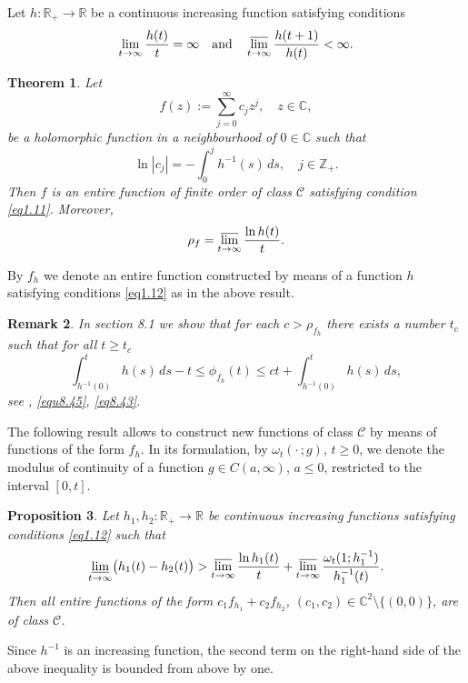 \documentclass[11pt, oneside]{amsart}
\newtheorem{Th}{Theorem}[section]
\newtheorem{Proposition}[Th]{Proposition}
\newtheorem{R}[Th]{Remark}
\begin{document}
Let $h: \mathbb R_+\rightarrow \mathbb R$ be a continuous increasing function satisfying conditions
\begin{equation}\label{eq1.12}
\lim_{t\rightarrow\infty}\frac{h(t)}{t}=\infty\quad {\rm and}\quad \varlimsup_{t\rightarrow\infty}\frac{h(t+1)}{h(t)}<\infty.
\end{equation}
\begin{Th}\label{theo1.11}
Let 
\[
f(z):=\sum_{j=0}^\infty c_j z^j,\quad z\in\mathbb C,
\]
be a holomorphic function in a neighbourhood of $0\in\mathbb C$ such that
\[
\ln |c_j|=-\int_0^{j} h^{-1}(s)\, ds,\quad j\in\mathbb Z_+.
\]
Then $f$ is an entire function of finite order of class $\mathscr C$ satisfying condition \eqref{eq1.11}. Moreover,
\[
\rho_f=\varlimsup_{t\rightarrow\infty}\frac{\ln h(t)}{t}.
\]
\end{Th}
By $f_h$ we denote an entire function constructed by means of a function $h$  satisfying conditions \eqref{eq1.12} as in the above result. 
\begin{R}\label{rem1.18}
{\rm In section 8.1 we show that for each $c>\rho_{f_h}$ there exists a number $t_c$ such that for all $t\ge t_c$
\[
\int_{h^{-1}(0)}^t h(s)\,ds-t\le \phi_{f_h}(t)\le ct+\int_{h^{-1}(0)}^t h(s)\,ds,
\]
see \cite[Ch.\,I.2]{L}, \eqref{equ8.45},  \eqref{eq8.43}.}
\end{R}
The following result allows to construct new functions of class $\mathscr C$ by means of functions of the form $f_h$.
In its formulation, by $\omega_t(\cdot\, ;g)$, $t\ge 0$, we denote the modulus of continuity of a function $g\in C(a,\infty)$, $a\le 0$, restricted to the interval $[0,t]$.
\begin{Proposition}\label{prop1.15}
Let $h_1,h_2:\mathbb R_+\rightarrow\mathbb R$ be continuous increasing functions satisfying conditions  \eqref{eq1.12} such that
\[
\varliminf_{t\rightarrow\infty}\bigl(h_1(t)-h_2(t)\bigr)>\varlimsup_{t\rightarrow\infty}\frac{\ln h_1(t)}{t}+\varlimsup_{t\rightarrow\infty}\frac{\omega_t(1;h_1^{-1})}{h_1^{-1}(t)}.
\]
Then all entire functions of the form $c_1f_{h_1}+c_2f_{h_2}$, $(c_1,c_2)\in\mathbb C^2\setminus\{(0,0)\}$, are of class $\mathscr C$.
\end{Proposition}
Since $h^{-1}$ is an increasing function, the second term on the right-hand side of the above inequality is bounded from above by one.
\end{document}
